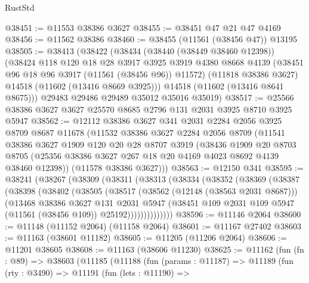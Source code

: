 \begin{lexlean}{RustStd}
\begin{coremodule}
@38451 := @11553 @38386 @3627
@38455 := @38451 @47 @21 @47 @4169
@38456 := @11562 @38386
@38460 := @38455 (@11561 (@38456 @47)) @13195
@38505 := @38413
    (@38422
      (@38434
        (@38440 (@38449 @38460 @12398))
        (@38424
          @118
          @120
          @18
          @28
          @3917
          @3925
          @3919
          @4380
          @8668
          @4139
          (@38451 @96 @18 @96 @3917 (@11561 (@38456 @96)) @11572)
          (@11818 @38386 @3627)
          @14518
          (@11602 (@13416 @8669 @3925)))
        @14518
        (@11602 (@13416 @8641 @8675)))
      @29483
      @29486
      @29489
      @35012
      @35016
      @35019)
@38517 := @25566 @38386 @3627 @3627 @25570 @8685 @2796 @131 @2031 @3925 @8710 @3925 @5947
@38562 := @12112
    @38386
    @3627
    @341
    @2031
    @2284
    @2056
    @3925
    @8709
    @8687
    @11678
    (@11532
      @38386
      @3627
      @2284
      @2056
      @8709
      (@11541
        @38386
        @3627
        @1909
        @120
        @20
        @28
        @8707
        @3919
        (@38436
          @1909
          @20
          @8703
          @8705
          (@25356 @38386 @3627 @267 @18 @20 @4169 @4023 @8692 @4139 @38460 @12398))
        (@11578 @38386 @3627)))
@38563 := @12150 @341
@38595 := @38241
    (@38267
      (@38309
        (@38311
          (@38313
            (@38334
              (@38352
                (@38369
                  (@38387
                    (@38398
                      (@38402
                        (@38505
                          (@38517
                            (@38562 (@12148 (@38563 @2031 @8687)))
                            (@13468
                              @38386
                              @3627
                              @131
                              @2031
                              @5947
                              (@38451
                                @109
                                @2031
                                @109
                                @5947
                                (@11561 (@38456 @109))
                                @25192))))))))))))))
@38596 := @11146 @2064
@38600 := @11148 (@11152 @2064) (@11158 @2064)
@38601 := @11167 @27402
@38603 := @11163 (@38601 @11182)
@38605 := @11205 (@11206 @2064)
@38606 := @11201 @38605
@38608 := @11163 (@38606 @11230)
@38625 := @11162
    (fun (fn : @89) =>
    @38603
      (@11185
        (@11188
          (fun (params : @11187) =>
          @11189
            (fun (rty : @3490) =>
            @11191
              (fun (lets : @11190) =>

\end{coremodule}
\end{lexlean}
